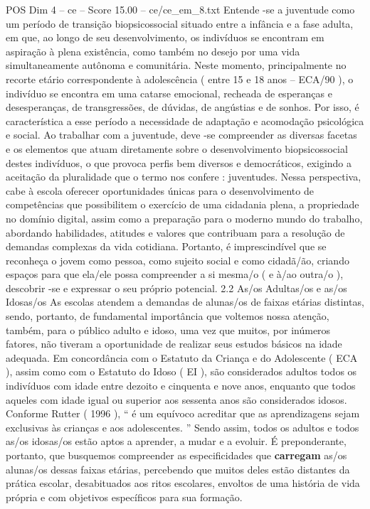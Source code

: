 \begin{textsample}{POS Dim 4 – ce – Score 15.00 – ce/ce\_em\_8.txt}
Entende -se a juventude como um período de transição biopsicossocial situado entre a infância e a fase adulta, em que, ao longo de seu desenvolvimento, os indivíduos se encontram em aspiração à plena existência, como também no desejo por uma vida simultaneamente autônoma e comunitária.
Neste momento, principalmente no recorte etário correspondente à adolescência ( entre 15 e 18 anos – ECA/90 ), o indivíduo se encontra em uma catarse emocional, recheada de esperanças e desesperanças, de transgressões, de dúvidas, de angústias e de sonhos.
Por isso, é característica a esse período a necessidade de adaptação e acomodação psicológica e social.
Ao trabalhar com a juventude, deve -se compreender as diversas facetas e os elementos que atuam diretamente sobre o desenvolvimento biopsicossocial destes indivíduos, o que provoca perfis bem diversos e democráticos, exigindo a aceitação da pluralidade que o termo nos confere : juventudes.
Nessa perspectiva, cabe à escola oferecer oportunidades únicas para o desenvolvimento de competências que possibilitem o exercício de uma cidadania plena, a propriedade no domínio digital, assim como a preparação para o moderno mundo do trabalho, abordando habilidades, atitudes e valores que contribuam para a resolução de demandas complexas da vida cotidiana.
Portanto, é imprescindível que se reconheça o jovem como pessoa, como sujeito social e como cidadã/ão, criando espaços para que ela/ele possa compreender a si mesma/o ( e à/ao outra/o ), descobrir -se e expressar o seu próprio potencial. 2.2 As/os Adultas/os e as/os Idosas/os As escolas atendem a demandas de alunas/os de faixas etárias distintas, sendo, portanto, de fundamental importância que voltemos nossa atenção, também, para o público adulto e idoso, uma vez que muitos, por inúmeros fatores, não tiveram a oportunidade de realizar seus estudos básicos na idade adequada.
Em concordância com o Estatuto da Criança e do Adolescente ( ECA ), assim como com o Estatuto do Idoso ( EI ), são considerados adultos todos os indivíduos com idade entre dezoito e cinquenta e nove anos, enquanto que todos aqueles com idade igual ou superior aos sessenta anos são considerados idosos.
Conforme Rutter ( 1996 ), “ é um equívoco acreditar que as aprendizagens sejam exclusivas às crianças e aos adolescentes. ” Sendo assim, todos os adultos e todos as/os idosas/os estão aptos a aprender, a mudar e a evoluir.
É preponderante, portanto, que busquemos compreender as especificidades que \textbf{carregam} as/os alunas/os dessas faixas etárias, percebendo que muitos deles estão distantes da prática escolar, desabituados aos ritos escolares, envoltos de uma história de vida própria e com objetivos específicos para sua formação.

\end{textsample}
